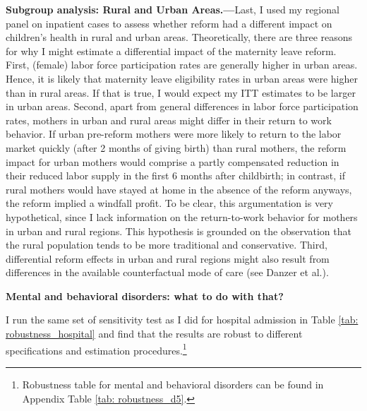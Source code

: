 \documentclass[11pt, a4paper,draft]{article} %
\begin{document}
\textbf{Subgroup analysis: Rural and Urban Areas.---}Last, I used my regional panel on inpatient cases to assess whether reform had a different impact on children's health in rural and urban areas. Theoretically, there are three reasons for why I might estimate a differential impact of the maternity leave reform. First, (female) labor force participation rates are generally higher in urban areas. Hence, it is likely that maternity leave eligibility rates in urban areas were higher than in rural areas. If that is true, I would expect my ITT estimates to be larger in urban areas. Second, apart from general differences in labor force participation rates, mothers in urban and rural areas might differ in their return to work behavior. If urban pre-reform mothers were more likely to return to the labor market quickly (after 2 months of giving birth) than rural mothers, the reform impact for urban mothers would comprise a partly compensated reduction in their reduced labor supply in the first 6 months after childbirth; in contrast, if rural mothers would have stayed at home in the absence of the reform anyways, the reform implied a windfall profit. To be clear, this argumentation is very hypothetical, since I lack information on the return-to-work behavior for mothers in urban and rural regions. This hypothesis is grounded on the observation that the rural population tends to be more traditional and conservative. Third, differential reform effects in urban and rural regions might also result from differences in the available counterfactual mode of care (see Danzer et al.). 

\bigskip




\textbf{Mental and behavioral disorders: what to do with that?}

I run the same set of sensitivity test as I did for hospital admission in Table \ref{tab: robustness_hospital} and find that the results are robust to different specifications and estimation procedures.\footnote{Robustness table for mental and behavioral disorders can be found in Appendix Table \ref{tab: robustness_d5}.}






\end{document}
